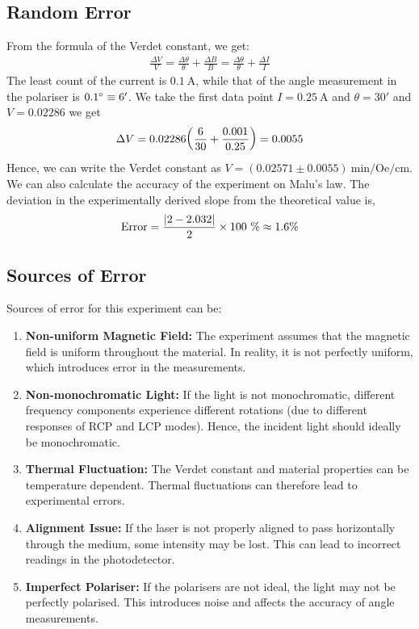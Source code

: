 \documentclass[usenames, svgnames, dvipsnames]{scrartcl}
\begin{document}
\subsection{Random Error}
From the formula of the Verdet constant, we get:
\begin{align}
  \frac{\Delta V}{V}=  \frac{\Delta \theta}{\theta}  + \frac{\Delta B}{B} = \frac{\Delta \theta}{\theta}  + \frac{\Delta I}{I} 
\end{align}
The least count of the current is $0.1\ \text{A}$, while that of the angle measurement in the polariser is $0.1\degree \equiv 6'$. We take the first data point $I= 0.25 \ \text{A}$ and $\theta = 30'$ and $V = 0.02286$ we get 
\begin{align*}
  \Delta V = 0.02286\qty(\frac{6}{30}+ \frac{0.001}{0.25}) = 0.0055
\end{align*}
Hence, we can write the Verdet constant as $V = (0.02571 \pm 0.0055)\  \text{min/Oe/cm}$. We can also calculate the accuracy of the experiment on Malu's law. The deviation in the experimentally derived slope from the theoretical value is, $$\text{Error} = \frac{\abs{2-2.032}}{2} \times 100 \ \% \approx 1.6 \% $$
\subsection{Sources of Error}

Sources of error for this experiment can be:

\begin{enumerate}
    \item \textbf{Non-uniform Magnetic Field:} The experiment assumes that the magnetic field is uniform throughout the material. In reality, it is not perfectly uniform, which introduces error in the measurements.

    \item \textbf{Non-monochromatic Light:} If the light is not monochromatic, different frequency components experience different rotations (due to different responses of RCP and LCP modes). Hence, the incident light should ideally be monochromatic.

    \item \textbf{Thermal Fluctuation:} The Verdet constant and material properties can be temperature dependent. Thermal fluctuations can therefore lead to experimental errors.

    \item \textbf{Alignment Issue:} If the laser is not properly aligned to pass horizontally through the medium, some intensity may be lost. This can lead to incorrect readings in the photodetector.

    \item \textbf{Imperfect Polariser:} If the polarisers are not ideal, the light may not be perfectly polarised. This introduces noise and affects the accuracy of angle measurements.
\end{enumerate}
\end{document}
